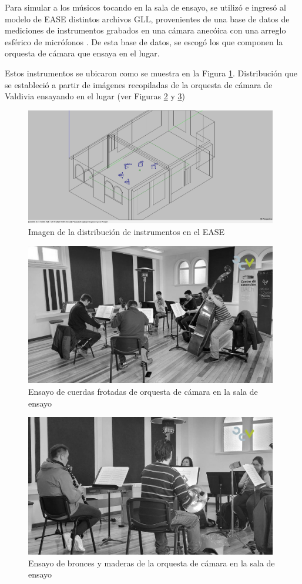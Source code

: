 \noindent Para simular a los músicos tocando en la sala de ensayo, se utilizó e ingresó al modelo de EASE distintos archivos GLL, provenientes
de una base de datos de mediciones de instrumentos grabados en una cámara anecóica con una arreglo esférico de micrófonos \cite{ackermann2023database}. 
De esta base de datos, se escogó los que componen la orquesta de cámara que ensaya en el lugar.

Estos instrumentos se ubicaron como se muestra en la Figura \ref{fig: EASE instrumentos}. Distribución que se estableció
a partir de imágenes recopiladas de la orquesta de cámara de Valdivia ensayando en el lugar (ver Figuras \ref{fig: ensayo cuerdas OCV} y \ref{fig: ensayo vientos OCV})
\begin{figure}
    \centering
    \includegraphics[width=11cm]{Imagenes/Modelacion/Instrumentos_ease.png}
    \caption{Imagen de la distribución de instrumentos en el EASE}
    \label{fig: EASE instrumentos}
\end{figure}
\begin{figure}[H]
    \centering
    \includegraphics[width=11cm]{Imagenes/OCV/OCV cuerdas.jpg}
    \caption{Ensayo de cuerdas frotadas de orquesta de cámara en la sala de ensayo}
    \label{fig: ensayo cuerdas OCV}
\end{figure}

\begin{figure}[H]
    \centering
    \includegraphics[width=11cm]{Imagenes/OCV/OCV vientos.jpg}
    \caption{Ensayo de bronces y maderas de la orquesta de cámara en la sala de ensayo}
    \label{fig: ensayo vientos OCV}
\end{figure}